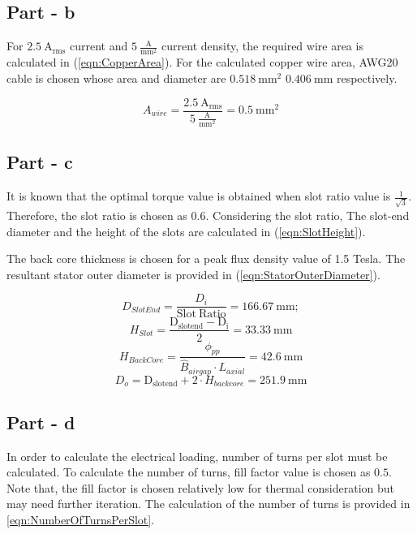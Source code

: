 \documentclass{article}
\begin{document}
 \subsection{Part - b}
 For $2.5 \: \mathrm{A_{rms}}$ current and $5 \: \mathrm{\frac{A}{mm^2}}$ current density, the required wire area is calculated in (\ref{eqn:CopperArea}). For the calculated copper wire area, AWG20 cable is chosen whose area and diameter are $0.518 \: \mathrm{mm^2}$ $0.406 \: \mathrm{mm}$ respectively.

\begin{equation} \label{eqn:CopperArea}
    A_{wire} = \frac{2.5 \: \mathrm{A_{rms}}}{5 \: \mathrm{\frac{A}{mm^2}}} =  0.5 \: \mathrm{mm^2}
\end{equation}

\subsection{Part - c}
It is known that the optimal torque value is obtained when slot ratio value is $\frac{1}{\sqrt{3}}$. Therefore, the slot ratio is chosen as $0.6$. Considering the slot ratio, The slot-end diameter and the height of the slots are calculated in (\ref{eqn:SlotHeight}). 

The back core thickness is chosen for a peak flux density value of 1.5 Tesla. The resultant stator outer diameter is provided in (\ref{eqn:StatorOuterDiameter}).

\begin{equation} \label{eqn:SlotEndDiameter}
    D_{SlotEnd} = \frac{D_i}{\mathrm{Slot \: Ratio}} = 166.67 \: \mathrm{mm};
\end{equation}
\begin{equation} \label{eqn:SlotHeight}
    H_{Slot} = \frac{\mathrm{D_{slotend}-D_i}}{2} = 33.33 \: \mathrm{mm}
\end{equation}
\begin{equation} \label{eqn:BackCoreDepth}
    H_{BackCore} = \frac{\phi_{pp}}{\hat{B}_{airgap} \cdot L_{axial}} = 42.6 \: \mathrm{mm}
\end{equation}
\begin{equation} \label{eqn:StatorOuterDiameter}
    D_{o} = \mathrm{D_{slotend}} + 2\cdot H_{backcore}= 251.9 \: \mathrm{mm}
\end{equation}

\subsection{Part - d}
In order to calculate the electrical loading, number of turns per slot must be calculated. To calculate the number of turns, fill factor value is chosen as $\pmb{0.5}$. Note that, the fill factor is chosen relatively low for thermal consideration but may need further iteration. The calculation of the number of turns is provided in \ref{eqn:NumberOfTurnsPerSlot}.
\end{document}
